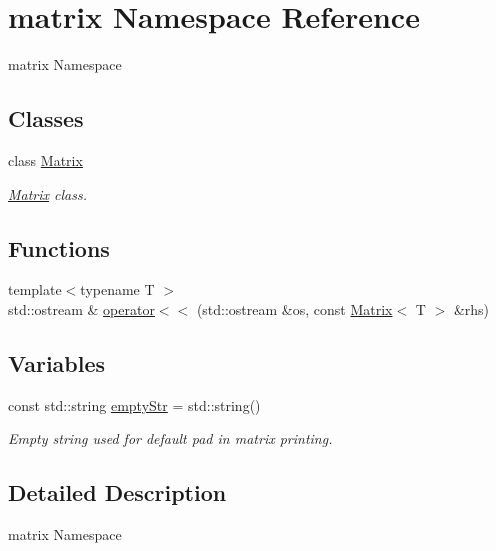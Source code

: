 \hypertarget{namespacematrix}{\section{matrix Namespace Reference}
\label{namespacematrix}
}


matrix Namespace  


\subsection*{Classes}
\begin{DoxyCompactItemize}
\item 
class \hyperlink{classmatrix_1_1Matrix}{Matrix}
\begin{DoxyCompactList}\small\item\em \hyperlink{classmatrix_1_1Matrix}{Matrix} class. \end{DoxyCompactList}\end{DoxyCompactItemize}
\subsection*{Functions}
\begin{DoxyCompactItemize}
\item 
{\footnotesize template$<$typename T $>$ }\\std\-::ostream \& \hyperlink{namespacematrix_ab73e58c81eae2fdc97f26f72f31fe5ff}{operator$<$$<$} (std\-::ostream \&os, const \hyperlink{classmatrix_1_1Matrix}{Matrix}$<$ T $>$ \&rhs)
\end{DoxyCompactItemize}
\subsection*{Variables}
\begin{DoxyCompactItemize}
\item 
const std\-::string \hyperlink{namespacematrix_a3410a3377815b8c5431e5436a31774c4}{empty\-Str} = std\-::string()
\begin{DoxyCompactList}\small\item\em Empty string used for default pad in matrix printing. \end{DoxyCompactList}\end{DoxyCompactItemize}


\subsection{Detailed Description}
matrix Namespace 

